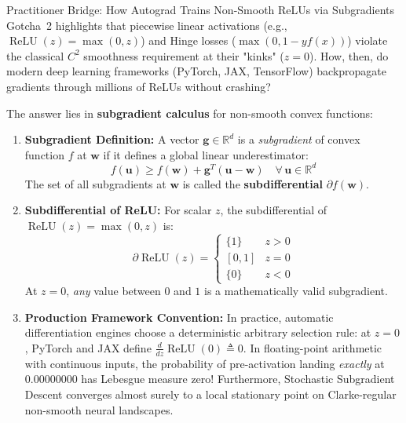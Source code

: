 \begin{intuitionbox}{Practitioner Bridge: How Autograd Trains Non-Smooth ReLUs via Subgradients}
Gotcha~2 highlights that piecewise linear activations (e.g., $\operatorname{ReLU}(z) = \max(0, z)$) and Hinge losses ($\max(0, 1 - y f(x))$) violate the classical $C^2$ smoothness requirement at their "kinks" ($z = 0$). How, then, do modern deep learning frameworks (PyTorch, JAX, TensorFlow) backpropagate gradients through millions of ReLUs without crashing?

The answer lies in \textbf{subgradient calculus} for non-smooth convex functions:
\begin{enumerate}
    \item \textbf{Subgradient Definition:} A vector $\mathbf{g} \in \mathbb{R}^d$ is a \emph{subgradient} of convex function $f$ at $\mathbf{w}$ if it defines a global linear underestimator:
    \begin{equation*}
    f(\mathbf{u}) \ge f(\mathbf{w}) + \mathbf{g}^T (\mathbf{u} - \mathbf{w}) \quad \forall \, \mathbf{u} \in \mathbb{R}^d
    \end{equation*}
    The set of all subgradients at $\mathbf{w}$ is called the \textbf{subdifferential} $\partial f(\mathbf{w})$.
    \item \textbf{Subdifferential of ReLU:} For scalar $z$, the subdifferential of $\operatorname{ReLU}(z) = \max(0, z)$ is:
    \begin{equation*}
    \partial \operatorname{ReLU}(z) = \begin{cases} \{1\} & z > 0 \\ [0, 1] & z = 0 \\ \{0\} & z < 0 \end{cases}
    \end{equation*}
    At $z = 0$, \emph{any} value between $0$ and $1$ is a mathematically valid subgradient.
    \item \textbf{Production Framework Convention:} In practice, automatic differentiation engines choose a deterministic arbitrary selection rule: at $z = 0$, PyTorch and JAX define $\frac{d}{dz}\operatorname{ReLU}(0) \triangleq 0$. In floating-point arithmetic with continuous inputs, the probability of pre-activation landing \emph{exactly} at $0.00000000$ has Lebesgue measure zero! Furthermore, Stochastic Subgradient Descent converges almost surely to a local stationary point on Clarke-regular non-smooth neural landscapes.
\end{enumerate}
\end{intuitionbox}


